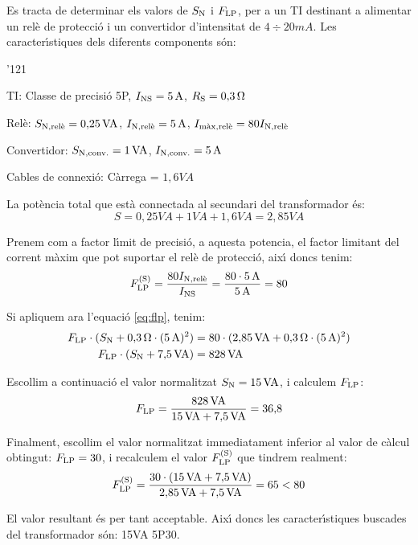 \begin{exemple}

Es tracta de determinar els valors de $S_\mathrm{N}$ i $F_\mathrm{LP}$,  per a un TI
destinant a alimentar  un rel\`{e} de protecci\'{o} i un convertidor d'intensitat de
$4\div20\unit{mA}$. Les caracter\'{\i}stiques dels diferents
components s\'{o}n:
\begin{dinglist}{'121}
    \item TI: Classe de precisi\'{o}  5P, $I_\mathrm{NS}=5\mathrm{\,A}$,
    $R_\mathrm{S}=0{,}3\mathrm{\,\mathrm{\Omega}}$
    \item Rel\`{e}: $S_\mathrm{N,rel\grave{e}}=0{,}25\mathrm{\,VA}$,
    $I_\mathrm{N,rel\grave{e}}=5\mathrm{\,A}$, $I_\mathrm{m\grave{a}x,rel\grave{e}}=
    80 I_\mathrm{N,rel\grave{e}}$
    \item Convertidor: $S_\mathrm{N,conv.}=1\mathrm{\,VA}$,
    $I_\mathrm{N,conv.}=5\mathrm{\,A}$
    \item Cables de connexi\'{o}: C\`{a}rrega = $1{,}6\unit{VA}$
\end{dinglist}

La pot\`{e}ncia total que est\`{a} connectada al secundari del transformador
\'{e}s:
\[
    S = 0{,}25\unit{VA} + 1\unit{VA} + 1{,}6\unit{VA} = 2{,}85\unit{VA}
\]

Prenem com a factor l\'{\i}mit de precisi\'{o},  a aquesta potencia, el
factor limitant del corrent m\`{a}xim que pot suportar el rel\`{e} de
protecci\'{o}, aix\'{\i} doncs tenim:
\[
    F_\mathrm{LP}^\mathrm{(S)} = \frac{80 I_\mathrm{N,rel\grave{e}}}{I_\mathrm{NS}} =
    \frac{80\cdot5\mathrm{\,A}}{5\mathrm{\,A}} = 80
\]

Si apliquem ara l'equaci\'{o} \eqref{eq:flp}, tenim:
\begin{align*}
    F_\mathrm{LP}\cdot(S_\mathrm{N}+0{,}3\mathrm{\,\mathrm{\Omega}} \cdot (5\mathrm{\,A})^2) &=
    80\cdot(2{,}85\mathrm{\,VA}+0{,}3\mathrm{\,\mathrm{\Omega}} \cdot (5\mathrm{\,A})^2) \\
    F_\mathrm{LP}\cdot(S_\mathrm{N}+7{,}5\mathrm{\,VA}) &= 828\mathrm{\,VA}
\end{align*}

Escollim a continuaci\'{o} el valor normalitzat $S_\mathrm{N}=
15\mathrm{\,VA}$, i calculem $F_\mathrm{LP}$:
\[
    F_\mathrm{LP} = \frac{828\mathrm{\,VA}}{15\mathrm{\,VA}+7{,}5\mathrm{\,VA}}
    = 36{,}8
\]

Finalment, escollim el valor normalitzat immediatament inferior al valor
de c\`{a}lcul obtingut: $F_\mathrm{LP} = 30$, i
recalculem el valor $F_\mathrm{LP}^\mathrm{(S)}$ que tindrem realment:
\[
    F_\mathrm{LP}^\mathrm{(S)} = \frac{30\cdot(15\mathrm{\,VA} + 7{,}5\mathrm{\,VA})}
    {2{,}85\mathrm{\,VA} + 7{,}5\mathrm{\,VA}} = 65 < 80
    \]

    El valor resultant \'{e}s per tant acceptable. Aix\'{\i} doncs les
    caracter\'{\i}stiques buscades del transformador s\'{o}n: 15\unit{VA} 5P30.

\end{exemple}


